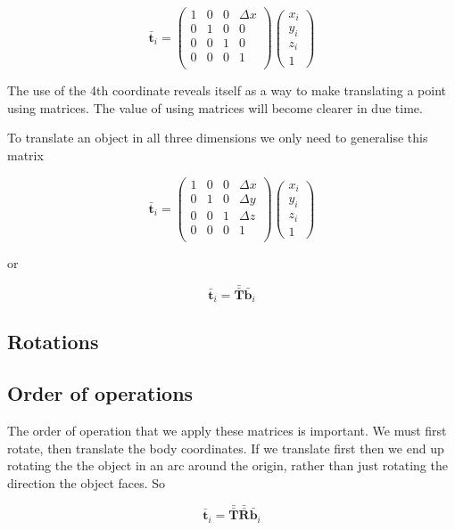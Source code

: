 \documentclass[12pt]{article}
\renewcommand{\vec}[1]{\ensuremath{\mathbf{\bar{#1}}}}
\newcommand{\mat}[1]{\ensuremath{\mathbf{\bar{\bar{#1}}}}}
\begin{document}
$$
\vec{t}_i = 
\begin{pmatrix}
1 & 0 & 0 & \Delta x \\ 
0 & 1 & 0 & 0 \\ 
0 & 0 & 1 & 0 \\ 
0 & 0 & 0 & 1 \\ 
\end{pmatrix}
\begin{pmatrix}x_i \\ y_i \\ z_i \\ 1 \end{pmatrix} 
$$

The use of the 4th coordinate reveals itself as a way to make translating a point using matrices. The value of using matrices will become clearer in due time. 

To translate an object in all three dimensions we only need to generalise this matrix 

$$
\vec{t}_i = 
\begin{pmatrix}
1 & 0 & 0 & \Delta x \\ 
0 & 1 & 0 & \Delta y \\ 
0 & 0 & 1 & \Delta z \\ 
0 & 0 & 0 & 1 \\ 
\end{pmatrix}
\begin{pmatrix}x_i \\ y_i \\ z_i \\ 1 \end{pmatrix} 
$$

or 

$$
\vec{t}_i = \mat{T} \vec{b}_i
$$


\subsection{Rotations}


\subsection{Order of operations}
The order of operation that we apply these matrices is important. We must first rotate, then translate the body coordinates. If we translate first then we end up rotating the the object in an arc around the origin, rather than just rotating the direction the object faces. So

$$
\vec{t}_i = \mat{T} \mat{R} \vec{b}_i
$$
\end{document}

